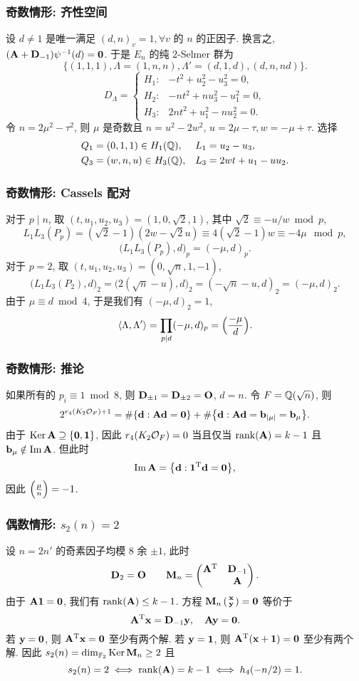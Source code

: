 \documentclass{beamer}
\begin{document}
\begin{frame}
\frametitle{奇数情形: 齐性空间}
设 $d\neq 1$ 是唯一满足 $(d,n)_v=1,\forall v$ 的 $n$ 的正因子. 换言之, $({\mathbf{A}}+{\mathbf{D}}_{-1})\psi^{-1}(d)={\bf0}$. 于是 $E_n$ 的纯 $2$-Selmer 群为
\[\{(1,1,1), \Lambda=(1,n,n), \Lambda'=(d,1,d), (d,n,nd)\}.\]
\[D_\Lambda=\begin{cases}
H_1:& -t^2+u_2^2-u_3^2=0,\\
H_2:& -nt^2+nu_3^2-u_1^2=0,\\
H_3:& 2nt^2+u_1^2-nu_2^2=0.
\end{cases}\]
令 $n=2\mu^2-\tau^2$, 则 $\mu$ 是奇数且 $n=u^2-2w^2$, $u=2\mu-\tau, w=-\mu+\tau$. 选择
\begin{align*}
Q_1&=(0,1,1)\in H_1({\mathbb{Q}}),& L_1&=u_2-u_3,\\
Q_3&=(w,n,u)\in H_3({\mathbb{Q}}),& L_3&=2wt+u_1-uu_2.
\end{align*}
\end{frame}

\begin{frame}
\frametitle{奇数情形: Cassels 配对}
对于 $p\mid n$, 取 $(t,u_1,u_2,u_3)=(1,0,\sqrt{2},1)$, 其中 $\sqrt{2}\equiv -u/w\bmod p$,
\[L_1L_3(P_p)=(\sqrt{2}-1)(2w-\sqrt{2}u)\equiv 4(\sqrt{2}-1)w\equiv -4\mu\mod p,\]
\[\bigl(L_1L_3(P_p),d\bigr)_p=(-\mu,d)_p.\] 
对于 $p=2$, 取 $(t,u_1,u_2,u_3)=(0,\sqrt{n},1,-1)$,
\[\bigl(L_1L_3(P_2),d\bigr)_2=\bigl(2(\sqrt{n}-u),d\bigr)_2=(-\sqrt{n}-u,d)_2=(-\mu,d)_2.\]
由于 $\mu\equiv d\bmod 4$, 于是我们有 $(-\mu,d)_2=1$,
\[\langle{\Lambda,\Lambda'}\rangle=\prod_{p\mid d}(-\mu,d)_p=\Bigl(\frac{{-\mu}}{d}\Bigr).\]
\end{frame}

\begin{frame}
\frametitle{奇数情形: 推论}
如果所有的 $p_i\equiv1\bmod8$, 则 ${\mathbf{D}}_{\pm1}={\mathbf{D}}_{\pm2}={\mathbf{O}}$, $d=n$. 令 $F={\mathbb{Q}}(\sqrt{n})$, 则
\[2^{r_4(K_2{\mathcal{O}}_F)+1}=\#{\left\{{\mathbf{d}}: {\mathbf{A}}{\mathbf{d}}={\bf0}\right\}}+\#{\left\{{\mathbf{d}}:{\mathbf{A}}{\mathbf{d}}={\mathbf{b}}_{|\mu|}={\mathbf{b}}_\mu\right\}}.\]
由于 $\operatorname{Ker} {\mathbf{A}}\supseteq{\left\{{\bf0},{\bf1}\right\}}$, 因此 $r_4(K_2{\mathcal{O}}_F)=0$ 当且仅当 $\operatorname{rank} ({\mathbf{A}})=k-1$ 且 ${\mathbf{b}}_\mu\notin\operatorname{Im}{\mathbf{A}}$. 但此时
\[\operatorname{Im}{\mathbf{A}}={\left\{{\mathbf{d}}:{\bf1}^{\mathrm{T}}{\mathbf{d}}={\bf0}\right\}},\]
因此 $\Bigl(\frac{{\mu}}{n}\Bigr)=-1$.
\end{frame}

\begin{frame}
\frametitle{偶数情形: $s_2(n)=2$}
设 $n=2n'$ 的奇素因子均模 $8$ 余 $\pm1$, 此时
\[{\mathbf{D}}_2={\mathbf{O}}\qquad 
{\mathbf{M}}_n=\begin{pmatrix}
{\mathbf{A}}^{\mathrm{T}}&{\mathbf{D}}_{-1}\\
&{\mathbf{A}}
\end{pmatrix}.\]
由于 ${\mathbf{A}}{\bf1}={\bf0}$, 我们有 $\operatorname{rank}({\mathbf{A}})\le k-1$.
方程 ${\mathbf{M}}_n\left(\begin{smallmatrix}
{\mathbf{x}}\\{\mathbf{y}}
\end{smallmatrix}\right)={\bf0}$ 等价于
\[{\mathbf{A}}^{\mathrm{T}} {\mathbf{x}}={\mathbf{D}}_{-1}{\mathbf{y}},\quad {\mathbf{A}}{\mathbf{y}}={\bf0}.\]
若 ${\mathbf{y}}={\bf0}$, 则 ${\mathbf{A}}^{\mathrm{T}}{\mathbf{x}}={\bf0}$ 至少有两个解.
若 ${\mathbf{y}}={\bf1}$, 则 ${\mathbf{A}}^{\mathrm{T}}({\mathbf{x}}+{\bf1})={\bf0}$ 至少有两个解. 因此 $s_2(n)=\dim_{{\mathbb{F}}_2}\operatorname{Ker}{\mathbf{M}}_n\ge 2$ 且
\[s_2(n)=2\iff \operatorname{rank}({\mathbf{A}})=k-1\iff h_4(-n/2)=1.\]
\end{frame}
\end{document}
